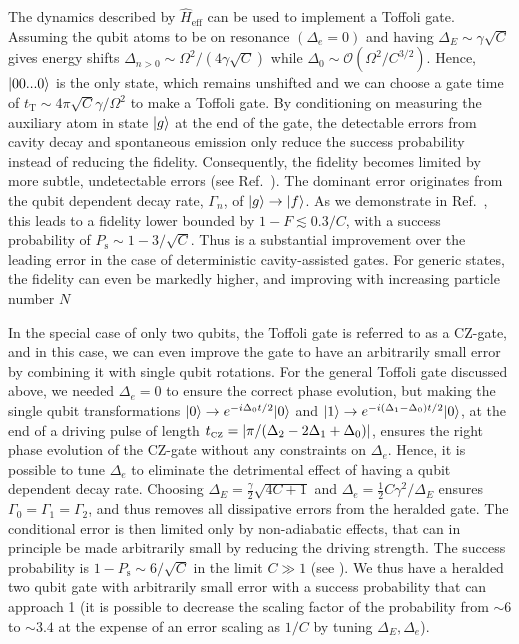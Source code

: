 The dynamics described by $\hat{H}_{\text{eff}}$ can be used to implement a
Toffoli gate. Assuming the qubit atoms to be on resonance $(\Delta_{e}=0)$ and
having $\Delta_{E}\sim\gamma\sqrt{C}$ gives energy shifts
$\Delta_{n>0}\sim\Omega^{2}/(4\gamma\sqrt{C})$ while
$\Delta_{0}\sim\mathcal{O}(\Omega^{2}/C^{3/2})$. Hence, $| 00...0 \rangle$ is the
only state, which remains unshifted and we can choose a gate time of
$t_{\text{T}}\sim4\pi\sqrt{C}\gamma/\Omega^{2}$ to make a Toffoli gate. By
conditioning on measuring the auxiliary atom in state $| g \rangle$ at the end of
the gate, the detectable errors from cavity decay and spontaneous emission only
reduce the success probability instead of reducing the fidelity. Consequently,
the fidelity becomes limited by more subtle, undetectable errors (see
Ref.~\cite{SM}). The dominant error originates from the qubit dependent decay
rate, $\Gamma_{n}$, of $| g \rangle\to| f \rangle$. As we demonstrate in Ref.~\cite{SM},
this leads to a fidelity lower bounded by $1-F \lesssim 0.3/C$, with a success
probability of $P_{\text{s}} \sim 1 - 3/\sqrt{C}$. Thus is a substantial
improvement over the leading error in the case of deterministic cavity-assisted
gates. For generic states, the fidelity can even be markedly higher, and
improving with increasing particle number $N$ \cite{SM}

In the special case of only two qubits, the Toffoli gate is referred to as a
CZ-gate, and in this case, we can even improve the gate to have an arbitrarily
small error by combining it with single qubit rotations. For the general Toffoli
gate discussed above, we needed $\Delta_e=0$ to ensure the correct phase
evolution, but making the single qubit transformations $| 0 \rangle\to
e^{-i\Delta_{0}t/2}| 0 \rangle$ and $| 1 \rangle\to
e^{-i(\Delta_{1}-\Delta_{0})t/2}| 0 \rangle$, at the end of a driving pulse of
length $t_{\mbox{\tiny CZ}}=\left| \pi/(\Delta_{2}-2\Delta_{1}+\Delta_{0}) \right|$, ensures
the right phase evolution of the CZ-gate without any constraints on
$\Delta_{e}$. Hence, it is possible to tune $\Delta_{e}$ to eliminate the
detrimental effect of having a qubit dependent decay rate. Choosing
$\Delta_{E}=\frac{\gamma}{2}\sqrt{4C+1}$ and
$\Delta_{e}=\frac{1}{2}C\gamma^{2}/\Delta_{E}$ ensures
$\Gamma_0=\Gamma_1=\Gamma_2$, and thus removes all dissipative errors from the
heralded gate. The conditional error is then limited only by non-adiabatic
effects, that can in principle be made arbitrarily small by reducing the driving
strength. The success probability is $1-P_{\text{s}}\sim 6/\sqrt{C}$ in the
limit $C\gg1$ (see ).
We thus have a heralded two qubit gate with arbitrarily small error with a
success probability that can approach 1 (it is possible to decrease the scaling
factor of the probability from $\sim6$ to $\sim3.4$ at the expense of an error
scaling as $1/C$ by tuning $\Delta_{E},\Delta_{e}$).

